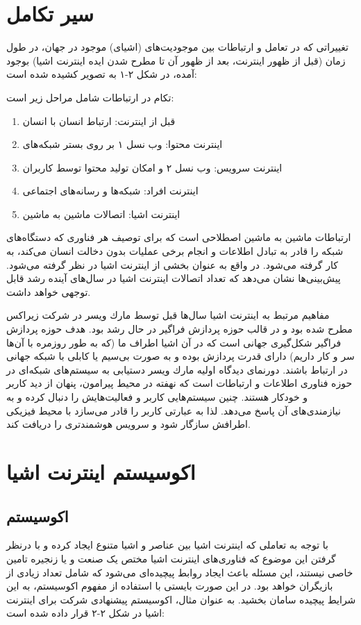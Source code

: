 \section{سیر تکامل}
تغییراتی که در تعامل و ارتباطات بین موجودیت‌های (اشیای) موجود در جهان، در طول زمان (قبل از ظهور اینترنت، بعد از ظهور آن تا مطرح شدن ایده اینترنت اشیا) بوجود آمده، در شكل ۲-۱ به
تصویر کشیده شده است:


تكام در ارتباطات شامل مراحل زیر است:
\begin{enumerate}
	\item
	 قبل از اینترنت: ارتباط انسان با انسان
	\item
	اینترنت محتوا: وب نسل ۱ بر روی بستر شبکه‌های 
	\item 
	اینترنت سرویس: وب نسل ۲ و امکان تولید محتوا توسط کاربران
	\item 
	اینترنت افراد: شبکه‌ها و رسانه‌های اجتماعی
	\item
	اینترنت اشیا: اتصالات ماشین به ماشین
\end{enumerate}
ارتباطات ماشین به ماشین  اصطلاحی است که برای توصیف هر فناوری که دستگاه‌های شبكه را قادر به تبادل اطلاعات و انجام برخی عملیات بدون دخالت انسان می‌کند، به کار گرفته می‌شود. در واقع به عنوان بخشی از اینترنت اشیا در نظر گرفته می‌شود. پیش‌بینی‌ها نشان می‌دهد که تعداد اتصالات اینترنت اشیا در سال‌های آینده رشد قابل توجهی خواهد داشت.


مفاهیم مرتبط به اینترنت اشیا سال‌ها قبل توسط مارك ویسر در شرکت زیراکس مطرح شده بود و
در قالب حوزه پردازش فراگیر در حال رشد بود. هدف حوزه پردازش فراگیر شكل‌گیری جهانی است که در آن اشیا اطراف ما (که به طور روزمره با آن‌ها سر و کار داریم) دارای قدرت پردازش بوده و به
صورت بی‌سیم یا کابلی با شبكه جهانی در ارتباط باشند. دورنمای دیدگاه اولیه مارك ویسر دستیابی به سیستم‌های شبكه‌ای در حوزه فناوری اطلاعات و ارتباطات است که نهفته در محیط پیرامون، پنهان از دید کاربر و خودکار هستند. چنین سیستم‌هایی کاربر و فعالیت‌هایش را دنبال کرده و به نیازمندی‌های آن پاسخ می‌دهد. لذا به عبارتی کاربر را قادر می‌سازد با محیط فیزیكی اطرافش سازگار شود و سرویس هوشمندتری را دریافت کند.

\section{اکوسیستم اینترنت اشیا}
\subsection{اکوسیستم}
با توجه به تعاملی که اینترنت اشیا بین عناصر و اشیا متنوع ایجاد کرده و با درنظر گرفتن این موضوع که فناوری‌های اینترنت اشیا مختص یک صنعت و یا زنجیره تامین خاصی نیستند، این مسئله باعث ایجاد روابط پیچیده‌ای می‌شود که شامل تعداد زیادی از بازیگران خواهد بود. در این صورت بایستی با استفاده از مفهوم اکوسیستم، به این شرایط پیچیده سامان بخشید. به عنوان مثال، اکوسیستم پیشنهادی شرکت  برای اینترنت اشیا در شكل ۲-۲ قرار داده‌ شده‌ است:


